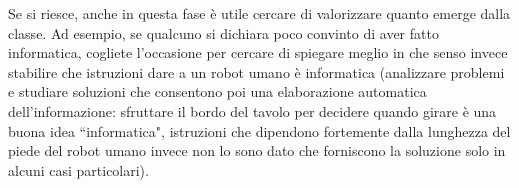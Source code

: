 \documentclass[12pt]{article}
\begin{document}
Se si riesce, anche in questa fase è utile cercare di valorizzare quanto emerge dalla classe. Ad esempio, se qualcuno si dichiara poco convinto di aver fatto informatica, cogliete l’occasione per cercare di spiegare meglio in che senso invece stabilire che istruzioni dare a un robot umano è informatica (analizzare problemi e studiare soluzioni che consentono poi una elaborazione automatica dell’informazione: sfruttare il bordo del tavolo per decidere quando girare è una buona idea ``informatica", istruzioni che dipendono fortemente dalla lunghezza del piede del robot umano invece non lo sono dato che forniscono la soluzione solo in alcuni casi particolari).
\end{document}
